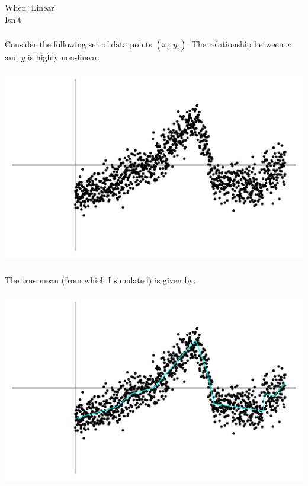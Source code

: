\begin{frame}[fragile] \frametitle{}

\begin{flushright}
{\color{yaleblue}\sc\fontsize{1cm}{1cm}\selectfont When `Linear' \\\medskip Isn't}
\end{flushright}

\end{frame}

\begin{frame}[fragile] \frametitle{}

Consider the following set of data points $(x_i, y_i)$. The relationship
between $x$ and $y$ is highly non-linear.

\includegraphics[width=\linewidth]{img/fig04.pdf}

\end{frame}

\begin{frame}[fragile] \frametitle{}

The true mean (from which I simulated) is given by:

\includegraphics[width=\linewidth]{img/fig05.pdf}

\end{frame}

